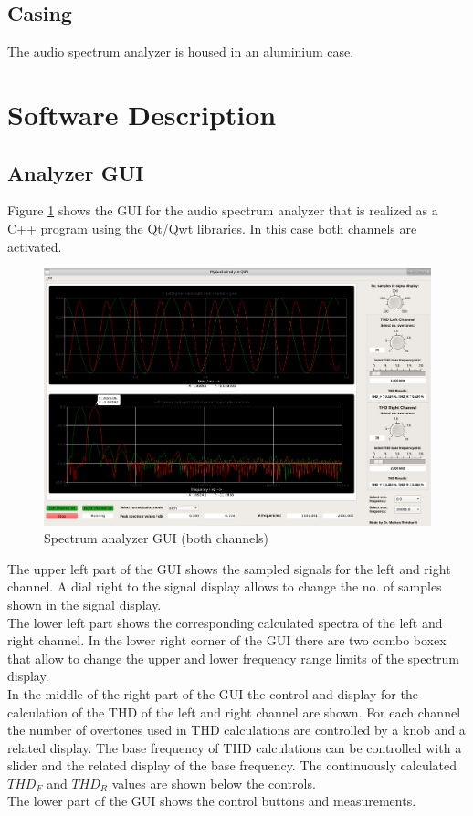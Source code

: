 \documentclass[11pt, oneside]{scrartcl}   	%
\begin{document}
\subsection{Casing}
The audio spectrum analyzer is housed in an aluminium case.

\newpage
\section{Software Description}
\subsection{Analyzer GUI}
Figure \ref{fig:SpectrumAnalyzerGUI} shows the GUI for the audio spectrum analyzer that is realized as a C++  program using the Qt/Qwt libraries. In this case both channels are activated.
\begin{figure}[tbph]
	\centering
	\includegraphics[width=\linewidth]{MyAudioSpectrumAnalyzerGUI.png}
	\caption[Spectrum analyzer GUI (both channels)]{Spectrum analyzer GUI (both channels)}
	\label{fig:SpectrumAnalyzerGUI}
\end{figure}

The upper left part of the GUI shows the sampled signals for the left and right channel. A dial right to the signal display allows to change the no. of samples shown in the signal display.\\
The lower left part shows the corresponding calculated spectra of the left and right channel. In the lower right corner of the GUI there are two combo boxex that allow to change the upper and lower frequency range limits of the spectrum display.\\
In the middle of the right part of the GUI the control and display for the calculation of the THD of the left and right channel are shown. For each channel the number of overtones used in THD calculations are controlled by a knob and a related display. The base frequency of THD calculations can be controlled with a slider and the related display of the base frequency. The continuously calculated $THD_F$ and $THD_R$ values are shown below the controls. \\
The lower part of the GUI shows the control buttons and measurements.\\
\end{document}
